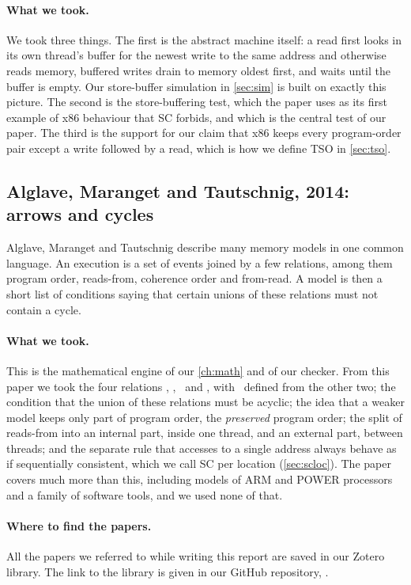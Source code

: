 \paragraph{What we took.} We took three things. The first is the abstract machine itself: a read first looks in its own thread's buffer for the newest write to the same address and otherwise reads memory, buffered writes drain to memory oldest first, and  waits until the buffer is empty. Our store-buffer simulation in \cref{sec:sim} is built on exactly this picture. The second is the store-buffering test, which the paper uses as its first example of x86 behaviour that SC forbids, and which is the central test of our paper. The third is the support for our claim that x86 keeps every program-order pair except a write followed by a read, which is how we define TSO in \cref{sec:tso}.

\subsection{Alglave, Maranget and Tautschnig, 2014: arrows and cycles}
\label{sec:alglave}

Alglave, Maranget and Tautschnig\cite{alglave2014} describe many memory models in one common language. An execution is a set of events joined by a few relations, among them program order, reads-from, coherence order and from-read. A model is then a short list of conditions saying that certain unions of these relations must not contain a cycle.

\paragraph{What we took.} This is the mathematical engine of our \cref{ch:math} and of our checker. From this paper we took the four relations \po, \rf, \co\ and \fr, with \fr\ defined from the other two; the condition that the union of these relations must be acyclic; the idea that a weaker model keeps only part of program order, the \emph{preserved} program order; the split of reads-from into an internal part, inside one thread, and an external part, between threads; and the separate rule that accesses to a single address always behave as if sequentially consistent, which we call SC per location (\cref{sec:scloc}). The paper covers much more than this, including models of ARM and POWER processors and a family of software tools, and we used none of that.

\paragraph{Where to find the papers.} All the papers we referred to while writing this report are saved in our Zotero library. The link to the library is given in our GitHub repository, \repourl.


